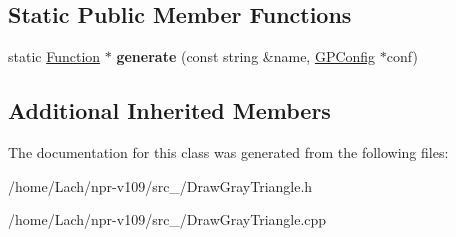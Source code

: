 \subsection*{Static Public Member Functions}
\begin{DoxyCompactItemize}
\item 
\hypertarget{classDrawGrayTriangle_ac9f2292e5d9b3709bb4f5fbb80a73e25}{}\label{classDrawGrayTriangle_ac9f2292e5d9b3709bb4f5fbb80a73e25} 
static \hyperlink{classFunction}{Function} $\ast$ {\bfseries generate} (const string \&name, \hyperlink{classGPConfig}{G\+P\+Config} $\ast$conf)
\end{DoxyCompactItemize}
\subsection*{Additional Inherited Members}


The documentation for this class was generated from the following files\+:\begin{DoxyCompactItemize}
\item 
/home/\+Lach/npr-\/v109/src\+\_/Draw\+Gray\+Triangle.\+h\item 
/home/\+Lach/npr-\/v109/src\+\_/Draw\+Gray\+Triangle.\+cpp\end{DoxyCompactItemize}
